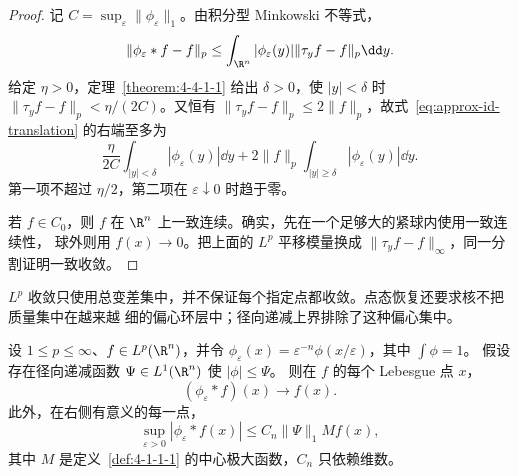 \begin{proof}
记 $C=\sup_\varepsilon\|\phi_\varepsilon\|_1$。由积分型 Minkowski 不等式，
\begin{equation}\label{eq:approx-id-translation}
 \|\phi_\varepsilon*f-f\|_p
 \le\int_{\R^n}|\phi_\varepsilon(y)|
       \|\tau_yf-f\|_p\dd y.
\end{equation}
给定 $\eta>0$，定理~\ref{theorem:4-4-1-1} 给出 $\delta>0$，使
$|y|<\delta$ 时 $\|\tau_yf-f\|_p<\eta/(2C)$。又恒有
$\|\tau_yf-f\|_p\le2\|f\|_p$，故式~\eqref{eq:approx-id-translation} 的右端至多为
\[
 \frac\eta{2C}\int_{|y|<\delta}|\phi_\varepsilon(y)|\dd y
 +2\|f\|_p\int_{|y|\ge\delta}|\phi_\varepsilon(y)|\dd y.
\]
第一项不超过 $\eta/2$，第二项在 $\varepsilon\downarrow0$ 时趋于零。

若 $f\in C_0$，则 $f$ 在 $\R^n$ 上一致连续。确实，先在一个足够大的紧球内使用一致连续性，
球外则用 $f(x)\to0$。把上面的 $L^p$ 平移模量换成
$\|\tau_yf-f\|_\infty$，同一分割证明一致收敛。
\end{proof}

$L^p$ 收敛只使用总变差集中，并不保证每个指定点都收敛。点态恢复还要求核不把质量集中在越来越
细的偏心环层中；径向递减上界排除了这种偏心集中。

\begin{theorem}\label{theorem:4-4-2-2}
设 $1\le p\le\infty$、$f\in L^p(\R^n)$，并令
$\phi_\varepsilon(x)=\varepsilon^{-n}\phi(x/\varepsilon)$，其中 $\int\phi=1$。
假设存在径向递减函数 $\Psi\in L^1(\R^n)$ 使 $|\phi|\le\Psi$。
则在 $f$ 的每个 Lebesgue 点 $x$，
\[
 (\phi_\varepsilon*f)(x)\longrightarrow f(x).
\]
此外，在右侧有意义的每一点，
\[
 \sup_{\varepsilon>0}|\phi_\varepsilon*f(x)|
 \le C_n\|\Psi\|_1Mf(x),
\]
其中 $M$ 是定义~\ref{def:4-1-1-1} 的中心极大函数，$C_n$ 只依赖维数。
\end{theorem}

